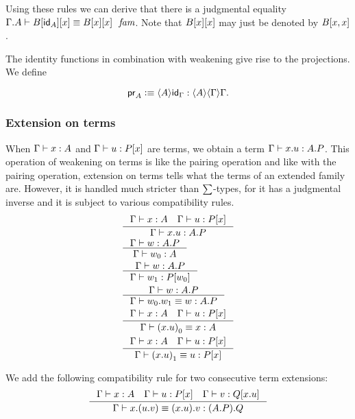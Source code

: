 Using these rules we can derive that there is a judgmental equality $\jfameq{\ctxext{\Gamma}{A}}{\subst{x}{{\idfunc[A]}{B}}}
{\subst{x}{{x}{B}}}$. Note that $\subst{x}{{x}{B}}$ may just be denoted by
$\subst{x,x}{B}$.

The identity functions in combination with weakening give rise to the projections.
We define

\begin{equation*}
\proj A \defeq \ctxwk{A}{\idfunc[\Gamma]}:\ctxwk{A}{{\Gamma}{\Gamma}}.
\end{equation*}

\subsubsection{Extension on terms}\label{extension-on-terms}
When $\jterm{\Gamma}{A}{x}$ and $\jterm{\Gamma}{\subst{x}{P}}{u}$ are terms,
we obtain a term $\jterm{\Gamma}{\ctxext{A}{P}}{\ctxext{x}{u}}$. This operation
of weakening on terms is like the pairing operation and like with the pairing
operation, extension on terms tells what the terms of an extended family are. 
However, it is handled
much stricter than $\textstyle\sum$-types, 
for it has a judgmental inverse and it is subject to various compatibility
rules.
\begin{align}
& \inference{\jterm{\Gamma}{A}{x}\quad\jterm{\Gamma}{\subst{x}{P}}{u}}{\jterm{\Gamma}{\ctxext{A}{P}}{\ctxext{x}{u}}}\\
& \inference{\jterm{\Gamma}{\ctxext{A}{P}}{w}}{\jterm{\Gamma}{A}{\pts{w}}}\\
& \inference{\jterm{\Gamma}{\ctxext{A}{P}}{w}}{\jterm{\Gamma}{\subst{\pts{w}}{P}}{\edg{w}}}\\
& \inference{\jterm{\Gamma}{\ctxext{A}{P}}{w}}{\jtermeq{\Gamma}{\ctxext{A}{P}}{\ctxext{\pts{w}}{\edg{w}}}{w}}\\
& \inference{\jterm{\Gamma}{A}{x}\quad\jterm{\Gamma}{\subst{x}{P}}{u}}{\jtermeq{\Gamma}{A}{\pts{(\ctxext{x}{u})}}{x}}\\
& \inference{\jterm{\Gamma}{A}{x}\quad\jterm{\Gamma}{\subst{x}{P}}{u}}{\jtermeq{\Gamma}{\subst{x}{P}}{\edg{(\ctxext{x}{u})}}{u}}
\end{align}

We add the following compatibility rule for two consecutive term extensions:
\begin{equation}
\inference{\jterm{\Gamma}{A}{x}\quad\jterm{\Gamma}{\subst{x}{P}}{u}\quad\jterm{\Gamma}{\subst{\ctxext{x}{u}}{Q}}{v}}
{\jtermeq{\Gamma}{\ctxext{{A}{P}}{Q}}{\ctxext{x}{{u}{v}}}{\ctxext{{x}{u}}{v}}}
\end{equation}

